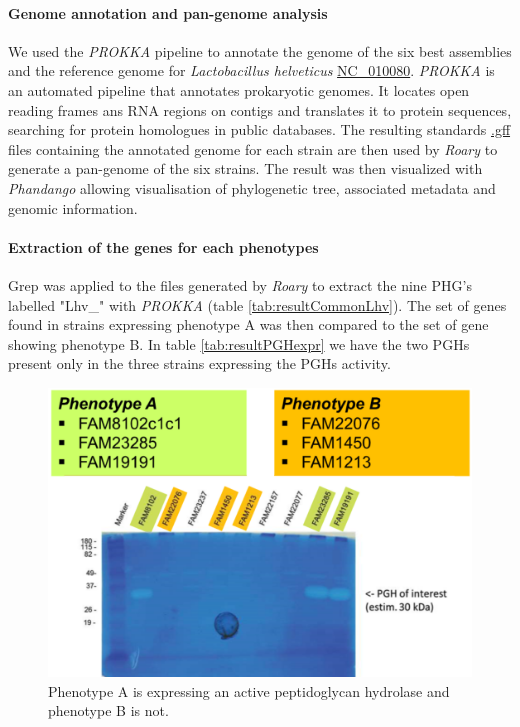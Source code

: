\documentclass[10pt,a4paper]{article}
\begin{document}
\paragraph{Genome annotation and pan-genome analysis}
We used the \textit{PROKKA} pipeline\cite{seemann_prokka:_2014} to annotate the genome of the six best assemblies and the reference genome for \textit{Lactobacillus helveticus} \href{https://www.ncbi.nlm.nih.gov/genome/?term=NC_010080}{NC\_010080}. \textit{PROKKA} is an automated pipeline that annotates prokaryotic genomes. It locates open reading frames ans RNA regions on contigs and translates it to protein sequences, searching for protein homologues in public databases. The resulting standards \href{https://www.ensembl.org/info/website/upload/gff.html}{.gff} files containing the annotated genome for each strain are then used by \textit{Roary}\cite{page_roary:_2015} to generate a pan-genome of the six strains. The result was then visualized with \textit{Phandango}\cite{hadfield_phandango:_2018} allowing visualisation of phylogenetic tree, associated metadata and genomic information.


\paragraph{Extraction of the genes for each phenotypes} Grep was applied to the files generated by \textit{Roary} to extract the nine PHG's \cite{jebava_nine_2011} labelled "Lhv\_" with \textit{PROKKA} (table \ref{tab:resultCommonLhv}). The set of genes found in strains expressing phenotype A was then compared to the set of gene showing phenotype B. In table \ref{tab:resultPGHexpr} we have the two PGHs present only in the three strains expressing the PGHs activity. 


\begin{figure}
	\centering
	\includegraphics[width=0.7\linewidth]{img/zymography}
	\caption[The two phenotypes expressed by the six strains]{Phenotype A is expressing an active peptidoglycan hydrolase and phenotype B is not.}
	\label{fig:zymography}
\end{figure}
\end{document}
